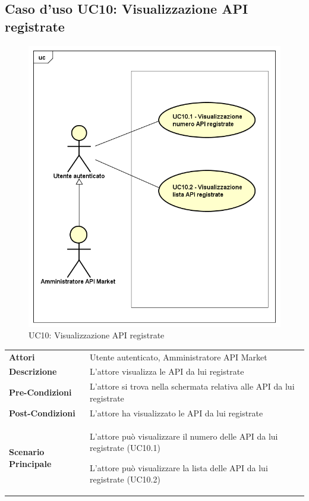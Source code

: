 \newpage
\subsection{Caso d'uso UC10: Visualizzazione API registrate}
\label{UC10}
\begin{figure}[ht]
	\centering
	\includegraphics[scale=0.45]{UML/UC10.png}
	\caption{UC10: Visualizzazione API registrate}
\end{figure}

\begin{longtable}{ l | p{11cm}}
	\hline
	\rowcolor{Gray}
	\multicolumn{2}{c}{UC10 - Visualizzazione API registrate}\\
	\hline
	\textbf{Attori} & Utente autenticato, Amministratore API Market \\
	\textbf{Descrizione} & L'attore visualizza le API da lui registrate \\
	\textbf{Pre-Condizioni} & L'attore si trova nella schermata relativa alle API da lui registrate \\
	\textbf{Post-Condizioni} & L'attore ha visualizzato le API da lui registrate \\
	\textbf{Scenario Principale} & 
	\begin{enumerate*}[label=(\arabic*.),itemjoin={\newline}]
		\item L'attore può visualizzare il numero delle API da lui registrate (UC10.1)
		\item L'attore può visualizzare la lista delle API da lui registrate (UC10.2)
	\end{enumerate*}\\
\end{longtable}

